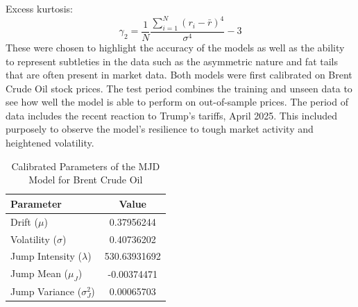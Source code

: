 \documentclass[12pt]{article}
\numberwithin{equation}{section}
\begin{document}
Excess kurtosis:
$$
\gamma_2 = \frac{1}{N}\frac{\sum_{i=1}^{N} (r_i - \bar{r})^4}{\sigma^4} - 3
$$
These 
were chosen to highlight the accuracy of the models as well as the ability to represent 
subtleties in the data such as the asymmetric nature and fat tails that are often 
present in market data. Both models were first calibrated on Brent Crude Oil stock 
prices. The test period combines the training and unseen data to see how well the 
model is able to perform on out-of-sample prices. The period of data includes the 
recent reaction to Trump's tariffs, April 2025. This included purposely to observe 
the model's resilience to tough market activity and heightened volatility. 
\begin{table}[h!]
\centering
\begin{tabular}{|l|c|}
\hline
\textbf{Parameter} & \textbf{Value} \\
\hline
Drift ($\mu$) & 0.37956244 \\
Volatility ($\sigma$) & 0.40736202 \\
Jump Intensity ($\lambda$) & 530.63931692 \\
Jump Mean ($\mu_J$) & -0.00374471 \\
Jump Variance ($\sigma_J^2$) & 0.00065703 \\
\hline
\end{tabular}
\caption{Calibrated Parameters of the MJD Model for Brent Crude Oil}
\label{tab:mjd_params}
\end{table}
\end{document}
